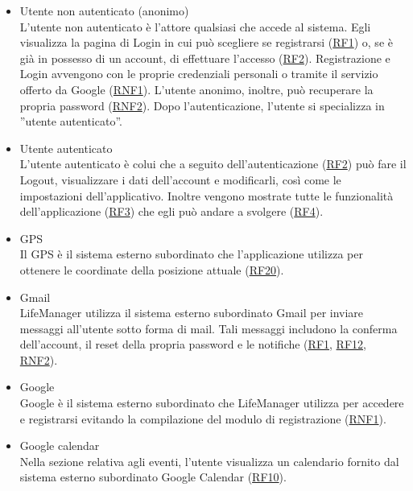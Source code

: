 \documentclass[a4paper,12pt]{article}
\begin{document}
\begin{itemize} \setlength\itemsep{0.01em}
  \item{\sffamily  Utente non autenticato (anonimo)}
    \\L'utente non autenticato è l'attore qualsiasi che accede al sistema. Egli visualizza la pagina di Login in cui può scegliere se registrarsi (\hyperlink{RF1}{RF1}) o, se è già in possesso di un account, di effettuare l'accesso (\hyperlink{RF2}{RF2}). Registrazione e Login avvengono con le proprie credenziali personali o tramite il servizio offerto da Google (\hyperlink{RNF1}{RNF1}). L'utente anonimo, inoltre, può recuperare la propria password (\hyperlink{RNF2}{RNF2}).
    Dopo l'autenticazione, l'utente si specializza in ''utente autenticato''.
    
    
 \item{\sffamily Utente autenticato}\\
    L'utente autenticato è colui che a seguito dell'autenticazione (\hyperlink{RF2}{RF2}) può fare il Logout, visualizzare i dati dell'account e modificarli, così come le impostazioni dell'applicativo. Inoltre vengono mostrate tutte le funzionalità dell'applicazione (\hyperlink{RF3}{RF3}) che egli può andare a svolgere (\hyperlink{RF4}{RF4}). 
   
   
  \item{\sffamily GPS}\\
    Il GPS è il sistema esterno subordinato che l'applicazione utilizza per ottenere le coordinate della posizione attuale (\hyperlink{RF20}{RF20}).
    
    
  \item{\sffamily Gmail}\\
    LifeManager utilizza il sistema esterno subordinato Gmail per inviare messaggi all'utente sotto forma di mail. Tali messaggi includono la conferma dell'account, il reset della propria password e le notifiche (\hyperlink{RF1}{RF1}, \hyperlink{RF12}{RF12}, \hyperlink{RNF2}{RNF2}).
  
  
 \item {\sffamily Google}\\
    Google è il sistema esterno subordinato che LifeManager utilizza per accedere e registrarsi evitando la compilazione del modulo di registrazione (\hyperlink{RNF1}{RNF1}).  
 
 \item {\sffamily Google calendar}\\
    Nella sezione relativa agli eventi, l'utente visualizza un calendario fornito dal sistema esterno subordinato Google Calendar (\hyperlink{RF10}{RF10}). 
 

\end{itemize}
\end{document}
